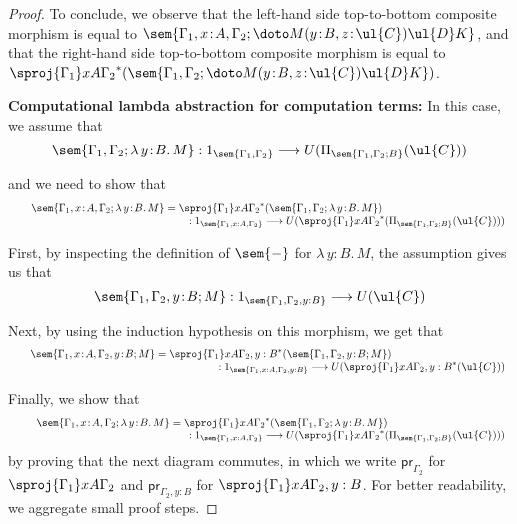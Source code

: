 \begin{proof}
To conclude, we observe that the left-hand side top-to-bottom composite morphism is equal to $\sem{\Gamma_1, x \!:\! A,\Gamma_2; \doto M {(y \!:\! B, z \!:\! \ul{C})} {\ul{D}} K}$, and that the right-hand side top-to-bottom composite morphism is equal to $\sproj {\Gamma_1} x A {\Gamma_2}^*(\sem{\Gamma_1,\Gamma_2;\doto M {(y \!:\! B, z \!:\! \ul{C})} {\ul{D}} K})$. 

\vspace{0.2cm}
\noindent
\textbf{Computational lambda abstraction for computation terms:}
In this case, we assume that 
\[
\sem{\Gamma_1,\Gamma_2; \lambda \, y \!:\! B .\, M} : 1_{\sem{\Gamma_1,\Gamma_2}} \longrightarrow U(\Pi_{\sem{\Gamma_1,\Gamma_2;B}}(\ul{C}))
\]

\pagebreak\noindent
and we need to show that
\[
\begin{array}{c}
\hspace{-3.5cm}
\sem{\Gamma_1, x \!:\! A,\Gamma_2; \lambda \, y \!:\! B .\, M} = 
\sproj {\Gamma_1} x A {\Gamma_2}^*(\sem{\Gamma_1,\Gamma_2; \lambda \, y \!:\! B .\, M}) 
\\
\hspace{5.75cm}
: 1_{\sem{\Gamma_1, x : A,\Gamma_2}} \longrightarrow U(\sproj {\Gamma_1} x A {\Gamma_2}^*(\Pi_{\sem{\Gamma_1,\Gamma_2;B}}(\ul{C})))
\end{array}
\]

First, by inspecting the definition of $\sem{-}$ for $\lambda \, y \!:\! B .\, M$, the assumption gives us that
\[
\sem{\Gamma_1,\Gamma_2, y \!:\! B ; M} : 1_{\sem{\Gamma_1,\Gamma_2, y : B}} \longrightarrow U(\ul{C})
\]

Next, by using the induction hypothesis on this morphism, we get that
\[
\begin{array}{c}
\hspace{-3.25cm}
\sem{\Gamma_1, x \!:\! A,\Gamma_2, y \!:\! B ; M} = 
\sproj {\Gamma_1} x A {\Gamma_2, y : B}^*(\sem{\Gamma_1,\Gamma_2, y \!:\! B ; M}) 
\\
\hspace{6.75cm}
: 1_{\sem{\Gamma_1, x : A,\Gamma_2, y : B}} \longrightarrow U(\sproj {\Gamma_1} x A {\Gamma_2, y : B}^*(\ul{C}))
\end{array}
\]

Finally, we show that
\[
\begin{array}{c}
\hspace{-3.15cm}
\sem{\Gamma_1, x \!:\! A,\Gamma_2; \lambda \, y \!:\! B .\, M} = 
\sproj {\Gamma_1} x A {\Gamma_2}^*(\sem{\Gamma_1,\Gamma_2; \lambda \, y \!:\! B .\, M}) 
\\
\hspace{5.75cm}
: 1_{\sem{\Gamma_1, x : A,\Gamma_2}} \longrightarrow U(\sproj {\Gamma_1} x A {\Gamma_2}^*(\Pi_{\sem{\Gamma_1,\Gamma_2;B}}(\ul{C})))
\end{array}
\]
by proving that the next diagram commutes, in which we write $\mathsf{pr}_{\Gamma_2}$ for $\sproj {\Gamma_1} x A {\Gamma_2}$ and $\mathsf{pr}_{\Gamma_2, y : B}$ for $\sproj {\Gamma_1} x A {\Gamma_2, y : B}$. For better readability, we aggregate small proof steps.


\end{proof}

